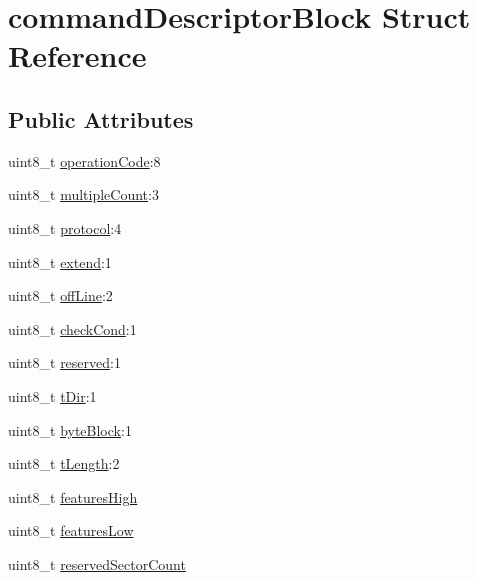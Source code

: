 \hypertarget{structcommandDescriptorBlock}{\section{command\+Descriptor\+Block Struct Reference}
\label{structcommandDescriptorBlock}
}
\subsection*{Public Attributes}
\begin{DoxyCompactItemize}
\item 
uint8\+\_\+t \hyperlink{structcommandDescriptorBlock_aaf9440d8f5eaef468ced9ccf5a35a198}{operation\+Code}\+:8
\item 
uint8\+\_\+t \hyperlink{structcommandDescriptorBlock_a32ebf87ad241e36d46bf924327b1737e}{multiple\+Count}\+:3
\item 
uint8\+\_\+t \hyperlink{structcommandDescriptorBlock_a0c372c0939eb5afd3e675f4fa39b0d64}{protocol}\+:4
\item 
uint8\+\_\+t \hyperlink{structcommandDescriptorBlock_ab4614377ec86f8cabe7b05195bf9c986}{extend}\+:1
\item 
uint8\+\_\+t \hyperlink{structcommandDescriptorBlock_abb39bf783f6d828c385f16b0909bdaaf}{off\+Line}\+:2
\item 
uint8\+\_\+t \hyperlink{structcommandDescriptorBlock_a8d174a9a3024662d102a749c00cca1be}{check\+Cond}\+:1
\item 
uint8\+\_\+t \hyperlink{structcommandDescriptorBlock_aceaec39d01724e696ce1e60c96e72d11}{reserved}\+:1
\item 
uint8\+\_\+t \hyperlink{structcommandDescriptorBlock_a31331001191953ebd586ef73c3a876b3}{t\+Dir}\+:1
\item 
uint8\+\_\+t \hyperlink{structcommandDescriptorBlock_a5a18bdc4bc910236e8aba0dec8fe88af}{byte\+Block}\+:1
\item 
uint8\+\_\+t \hyperlink{structcommandDescriptorBlock_a610b82f3718b46e8cb797403c7f39a02}{t\+Length}\+:2
\item 
uint8\+\_\+t \hyperlink{structcommandDescriptorBlock_a5c572c996c2b2392af8a7433791b9291}{features\+High}
\item 
uint8\+\_\+t \hyperlink{structcommandDescriptorBlock_abddd3964b7d29d274b01b9f76019435f}{features\+Low}
\item 
uint8\+\_\+t \hyperlink{structcommandDescriptorBlock_a4798d143da5fadb3b44fe820f9c96930}{reserved\+Sector\+Count}
\item 

\end{DoxyCompactItemize}
